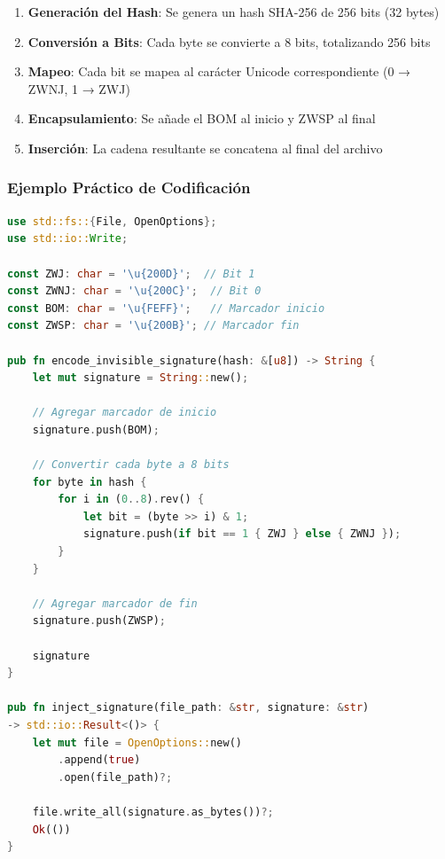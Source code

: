 \begin{enumerate}
\item \textbf{Generación del Hash}: Se genera un hash SHA-256 de 256 bits (32 bytes)
\item \textbf{Conversión a Bits}: Cada byte se convierte a 8 bits, totalizando 256 bits
\item \textbf{Mapeo}: Cada bit se mapea al carácter Unicode correspondiente (0 → ZWNJ, 1 → ZWJ)
\item \textbf{Encapsulamiento}: Se añade el BOM al inicio y ZWSP al final
\item \textbf{Inserción}: La cadena resultante se concatena al final del archivo
\end{enumerate}


\subsubsection{Ejemplo Práctico de Codificación}

\begin{lstlisting}[language=rust, caption={Codificación Zero-Width}]
use std::fs::{File, OpenOptions};
use std::io::Write;

const ZWJ: char = '\u{200D}';  // Bit 1
const ZWNJ: char = '\u{200C}';  // Bit 0  
const BOM: char = '\u{FEFF}';   // Marcador inicio
const ZWSP: char = '\u{200B}'; // Marcador fin

pub fn encode_invisible_signature(hash: &[u8]) -> String {
    let mut signature = String::new();
    
    // Agregar marcador de inicio
    signature.push(BOM);
    
    // Convertir cada byte a 8 bits
    for byte in hash {
        for i in (0..8).rev() {
            let bit = (byte >> i) & 1;
            signature.push(if bit == 1 { ZWJ } else { ZWNJ });
        }
    }
    
    // Agregar marcador de fin
    signature.push(ZWSP);
    
    signature
}

pub fn inject_signature(file_path: &str, signature: &str) 
-> std::io::Result<()> {
    let mut file = OpenOptions::new()
        .append(true)
        .open(file_path)?;
    
    file.write_all(signature.as_bytes())?;
    Ok(())
}
\end{lstlisting}

